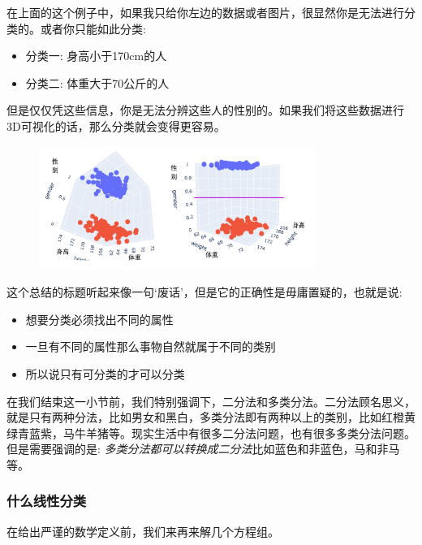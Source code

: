 \documentclass[12pt]{article}
\numberwithin{figure}{section}
\newenvironment{fullmodel}{
			\smallskip\noindent
			\begin{minipage}{\textwidth+\marginparwidth+\marginparsep}\smallskip\smallskip}
			{\smallskip\smallskip\end{minipage}\vspace{.1in}
			}
\numberwithin{equation}{section}
\begin{document}
在上面的这个例子中，如果我只给你左边的数据或者图片，很显然你是无法进行分类的。或者你只能如此分类:
\begin{itemize}
	\item 分类一: 身高小于170cm的人
	\item 分类二: 体重大于70公斤的人
\end{itemize}
但是仅仅凭这些信息，你是无法分辨这些人的性别的。如果我们将这些数据进行3D可视化的话，那么分类就会变得更容易。
\begin{figure}[H]
	\centering
	\includegraphics[width=0.8\textwidth]{fig/C2C2bmi3d}
\end{figure}

\begin{fullmodel}
	\begin{tcolorbox}[title=总结: 只有可分类的才可以分类]
		这个总结的标题听起来像一句`废话'，但是它的正确性是毋庸置疑的，也就是说:
		\begin{itemize}
			\item 想要分类必须找出不同的属性
			\item 一旦有不同的属性那么事物自然就属于不同的类别
			\item 所以说只有可分类的才可以分类
		\end{itemize}
	\end{tcolorbox}
\end{fullmodel}

在我们结束这一小节前，我们特别强调下，二分法和多类分法。二分法顾名思义，就是只有两种分法，比如男女和黑白，多类分法即有两种以上的类别，比如红橙黄绿青蓝紫，马牛羊猪等。现实生活中有很多二分法问题，也有很多多类分法问题。但是需要强调的是: \textit{多类分法都可以转换成二分法}比如蓝色和非蓝色，马和非马等。


\subsubsection{什么线性分类}

在给出严谨的数学定义前，我们来再来解几个方程组。
\end{document}
